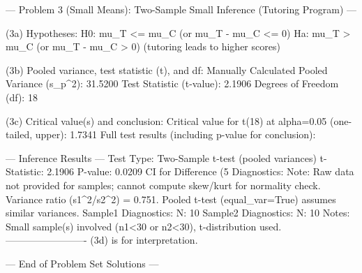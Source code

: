 --- Problem 3 (Small Means): Two-Sample Small Inference (Tutoring Program) ---

(3a) Hypotheses: H0: mu_T <= mu_C (or mu_T - mu_C <= 0)
                 Ha: mu_T > mu_C (or mu_T - mu_C > 0) (tutoring leads to higher scores)

(3b) Pooled variance, test statistic (t), and df:
  Manually Calculated Pooled Variance (s_p^2): 31.5200
  Test Statistic (t-value): 2.1906
  Degrees of Freedom (df): 18

(3c) Critical value(s) and conclusion:
  Critical value for t(18) at alpha=0.05 (one-tailed, upper): 1.7341
  Full test results (including p-value for conclusion):

--- Inference Results ---
  Test Type: Two-Sample t-test (pooled variances)
  t-Statistic: 2.1906
  P-value: 0.0209
  CI for Difference (5%
  Diagnostics:
    Note: Raw data not provided for samples; cannot compute skew/kurt for normality check. Variance ratio (s1^2/s2^2) = 0.751. Pooled t-test (equal_var=True) assumes similar variances.
    Sample1 Diagnostics:
      N: 10
    Sample2 Diagnostics:
      N: 10
  Notes: Small sample(s) involved (n1<30 or n2<30), t-distribution used.
-------------------------
(3d) is for interpretation.


--- End of Problem Set Solutions ---